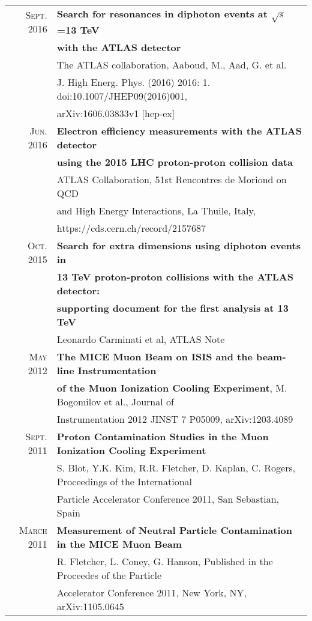 \documentclass[a4paper,10pt]{article} %
\begin{document}
\begin{tabular}{rl}
\textsc{Sept.} 2016 & \textbf{Search for resonances in diphoton events at $\sqrt{s}$=13 TeV} \\
									& \textbf{with the ATLAS detector} \\
									& The ATLAS collaboration, Aaboud, M., Aad, G. et al.  \\
									& J. High Energ. Phys. (2016) 2016: 1. doi:10.1007/JHEP09(2016)001, \\
									& arXiv:1606.03833v1 [hep-ex] \\
\textsc{Jun.} 2016 & \textbf{Electron efficiency measurements with the ATLAS detector} \\
									& \textbf{using the 2015 LHC proton-proton collision data} \\
									& ATLAS Collaboration, 51st Rencontres de Moriond on QCD \\
									& and High Energy Interactions, La Thuile, Italy, \\
									& https://cds.cern.ch/record/2157687 \\
\textsc{Oct.} 2015 & \textbf{Search for extra dimensions using diphoton events in} \\
									 & \textbf{13 TeV proton-proton collisions with the ATLAS detector:} \\
									 & \textbf{supporting document for the first analysis at 13 TeV} \\
									 & Leonardo Carminati et al, ATLAS Note \\
\textsc{May} 2012  & \textbf{The MICE Muon Beam on ISIS and the beam-line Instrumentation} \\
                   & \textbf{of the Muon Ionization Cooling Experiment}, M. Bogomilov et al., Journal of \\
				   & Instrumentation 2012 JINST 7 P05009, arXiv:1203.4089 \\
\textsc{Sept.} 2011 & \textbf{Proton Contamination Studies in the Muon Ionization Cooling Experiment} \\
					& S. Blot, Y.K. Kim, R.R. Fletcher, D. Kaplan, C. Rogers, Proceedings of the International \\
					& Particle Accelerator Conference 2011, San Sebastian, Spain \\
\textsc{March} 2011 & \textbf{Measurement of Neutral Particle Contamination in the MICE Muon Beam}\\
					& R. Fletcher, L. Coney, G. Hanson, Published in the Proceedes of the Particle \\
                    & Accelerator Conference 2011, New York, NY, arXiv:1105.0645\\

\end{tabular}
\end{document}
